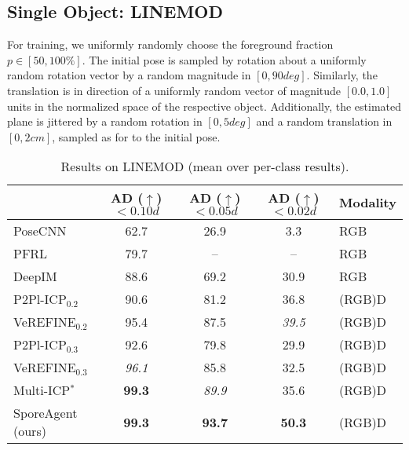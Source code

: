 \documentclass[10pt,twocolumn,letterpaper]{article}
\begin{document}
\subsection{Single Object: LINEMOD}
For training, we uniformly randomly choose the foreground fraction $p\in[50,100\%]$. The initial pose is sampled by rotation about a uniformly random rotation vector by a random magnitude in $[0, 90deg]$. Similarly, the translation is in direction of a uniformly random vector of magnitude $[0.0,1.0]$ units in the normalized space of the respective object. Additionally, the estimated plane is jittered by a random rotation in $[0,5deg]$ and a random translation in $[0,2cm]$, sampled as for to the initial pose.

\begin{table}[]
\footnotesize
\setlength\tabcolsep{1.3ex}
    \centering
    \begin{tabular}{l|ccc|l}
         & \makecell{AD ($\uparrow$)\\$<0.10d$} & \makecell{AD ($\uparrow$)\\$<0.05d$} & \makecell{AD ($\uparrow$)\\$<0.02d$} & Modality \\\hline
\rowcolor[rgb]{0.95,0.95,0.95}
PoseCNN \cite{xiang2017posecnn}             & 62.7 & 26.9 &  3.3 & RGB \\
PFRL \cite{shao2020pfrl}                & 79.7 & -- & -- & RGB \\
DeepIM \cite{li2018deepim}             & 88.6 & 69.2 & 30.9 & RGB \\ \hline
P2Pl-ICP$_{0.2}$ \cite{open3d}      & 90.6 & 81.2 & 36.8 & (RGB)D \\
VeREFINE$_{0.2}$ \cite{bauer2020verefine} & 95.4 & 87.5 & \textit{39.5} & (RGB)D \\
P2Pl-ICP$_{0.3}$ \cite{chen1992p2pl,open3d}      & 92.6 & 79.8 & 29.9 & (RGB)D \\
VeREFINE$_{0.3}$ \cite{bauer2020verefine} & \textit{96.1} & 85.8 & 32.5 & (RGB)D \\
Multi-ICP$^*$ \cite{xiang2017posecnn}      & \textbf{99.3} & \textit{89.9} & 35.6 & (RGB)D \\
SporeAgent (ours)   & \textbf{99.3} & \textbf{93.7} & \textbf{50.3} & (RGB)D \\
    \end{tabular}\vspace{1ex}
    \caption{Results on LINEMOD (mean over per-class results).
    }
    \label{tab:linemod}
\end{table}
\end{document}
